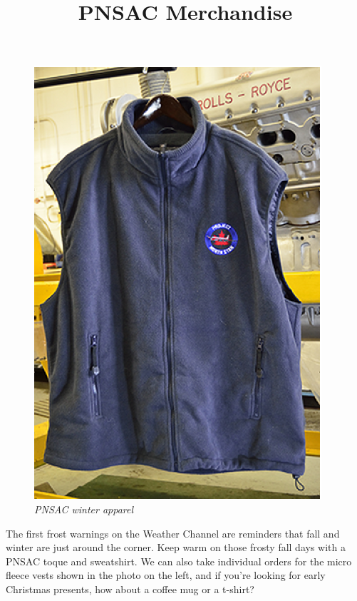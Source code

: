 %


\title{PNSAC Merchandise}

\maketitle


\begin{figure}[ht!]
   \vspace{2em}
   \centering
   \includegraphics[scale=1.0]{fleece_YOW7578.eps}
   \caption*{\small \em PNSAC winter apparel}
   \label{fig:merchandise}
\end{figure}



The first frost warnings on the Weather Channel are reminders that
fall and winter are just around the corner. Keep warm on those frosty
fall days with a PNSAC toque and sweatshirt. We can also take
individual orders for the micro fleece vests shown in the photo on the
left, and if you're looking for early Christmas presents, how about a
coffee mug or a t-shirt?

